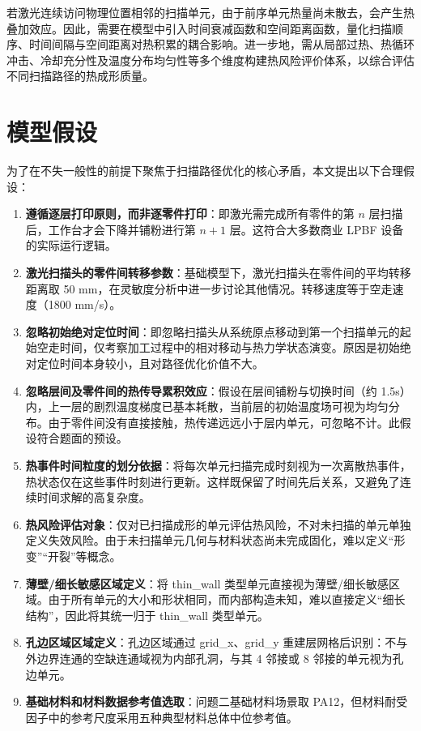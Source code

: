 \documentclass[a4paper, 12pt]{ctexart}
\begin{document}
若激光连续访问物理位置相邻的扫描单元，由于前序单元热量尚未散去，会产生热叠加效应。因此，需要在模型中引入时间衰减函数和空间距离函数，量化扫描顺序、时间间隔与空间距离对热积累的耦合影响。进一步地，需从局部过热、热循环冲击、冷却充分性及温度分布均匀性等多个维度构建热风险评价体系，以综合评估不同扫描路径的热成形质量。

\vspace{1em}
\section{模型假设}
\vspace{0.5em}

为了在不失一般性的前提下聚焦于扫描路径优化的核心矛盾，本文提出以下合理假设：
\begin{enumerate}
    \item \textbf{遵循逐层打印原则，而非逐零件打印}：即激光需完成所有零件的第 $n$ 层扫描后，工作台才会下降并铺粉进行第 $n+1$ 层。这符合大多数商业 LPBF 设备的实际运行逻辑。
    \item \textbf{激光扫描头的零件间转移参数}：基础模型下，激光扫描头在零件间的平均转移距离取 50 mm，在灵敏度分析中进一步讨论其他情况。转移速度等于空走速度（1800 mm/s）。
    \item \textbf{忽略初始绝对定位时间}：即忽略扫描头从系统原点移动到第一个扫描单元的起始空走时间，仅考察加工过程中的相对移动与热力学状态演变。原因是初始绝对定位时间本身较小，且对路径优化价值不大。
    \item \textbf{忽略层间及零件间的热传导累积效应}：假设在层间铺粉与切换时间（约 1.5s）内，上一层的剧烈温度梯度已基本耗散，当前层的初始温度场可视为均匀分布。由于零件间没有直接接触，热传递远远小于层内单元，可忽略不计。此假设符合题面的预设。
    \item \textbf{热事件时间粒度的划分依据}：将每次单元扫描完成时刻视为一次离散热事件，热状态仅在这些事件时刻进行更新。这样既保留了时间先后关系，又避免了连续时间求解的高复杂度。
    \item \textbf{热风险评估对象}：仅对已扫描成形的单元评估热风险，不对未扫描的单元单独定义失效风险。由于未扫描单元几何与材料状态尚未完成固化，难以定义“形变”“开裂”等概念。
    \item \textbf{薄壁/细长敏感区域定义}：将 thin\_wall 类型单元直接视为薄壁/细长敏感区域。由于所有单元的大小和形状相同，而内部构造未知，难以直接定义“细长结构”，因此将其统一归于 thin\_wall 类型单元。
    \item \textbf{孔边区域区域定义}：孔边区域通过 grid\_x、grid\_y 重建层网格后识别：不与外边界连通的空缺连通域视为内部孔洞，与其 4 邻接或 8 邻接的单元视为孔边单元。
    \item \textbf{基础材料和材料数据参考值选取}：问题二基础材料场景取 PA12，但材料耐受因子中的参考尺度采用五种典型材料总体中位参考值。
\end{enumerate}
\end{document}
